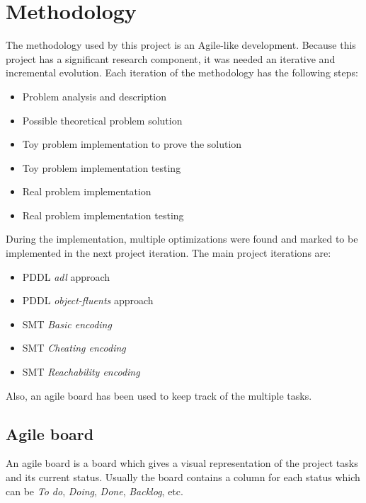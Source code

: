 \documentclass{report}
\theoremstyle{plain}
\begin{document}
\chapter{Methodology}
The methodology used by this project is an Agile-like development. Because this project has a significant research component, it was needed an iterative and incremental evolution. Each iteration of the methodology has the following steps:
\begin{itemize}
    \item Problem analysis and description
    \item Possible theoretical problem solution
    \item Toy problem implementation to prove the solution
    \item Toy problem implementation testing
    \item Real problem implementation
    \item Real problem implementation testing
\end{itemize}

\vspace{1\baselineskip}

During the implementation, multiple optimizations were found and marked to be implemented in the next project iteration. The main project iterations are:
\begin{itemize}
    \item PDDL \emph{adl} approach
    \item PDDL \emph{object-fluents} approach
    \item SMT \emph{Basic encoding}
    \item SMT \emph{Cheating encoding}
    \item SMT \emph{Reachability encoding}
\end{itemize}

\vspace{1\baselineskip}

Also, an agile board has been used to keep track of the multiple tasks. 

\section{Agile board}
An agile board is a board which gives a visual representation of the project tasks and its current status. Usually the board contains a column for each status which can be \textit{To do}, \textit{Doing}, \textit{Done}, \textit{Backlog}, etc.

\vspace{0.5\baselineskip}
\end{document}
